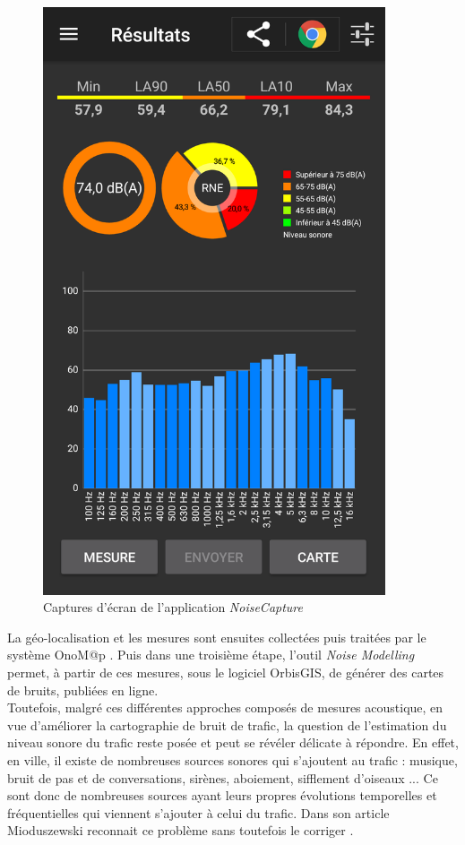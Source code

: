\begin{figure}
\begin{center}
\begin{minipage}[t]{0.3\textwidth}
        \includegraphics[width=0.9\textwidth]{./figures/autres/noiseCapture2.png}
    \end{minipage}
    \caption{Captures d'écran de l'application \textit{NoiseCapture}}
\end{center}
\end{figure}


La géo-localisation et les mesures sont ensuites collectées puis traitées par le système OnoM@p \cite{bocher_onomp_2016}. Puis dans une troisième étape, l'outil \textit{Noise Modelling} permet, à partir de ces mesures, sous le logiciel OrbisGIS, de générer des cartes de bruits, publiées en ligne.\\

Toutefois, malgré ces différentes approches composés de mesures acoustique, en vue d'améliorer la cartographie de bruit de trafic, la question de l'estimation du niveau sonore du trafic reste posée et peut se révéler délicate à répondre. En effet, en ville, il existe de nombreuses sources sonores qui s'ajoutent au trafic : musique, bruit de pas et de conversations, sirènes, aboiement, sifflement d'oiseaux ... Ce sont donc de nombreuses sources ayant leurs propres évolutions temporelles et fréquentielles qui viennent s'ajouter à celui du trafic. Dans son article Mioduszewski reconnait ce problème sans toutefois le corriger \cite{Mioduszewski}.\\

